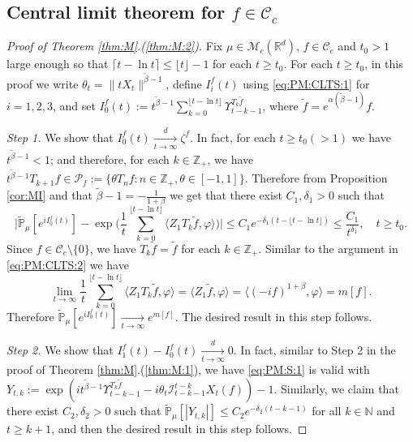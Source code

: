 \documentclass[EJP]{ejpecp} %
\begin{document}
\subsection{Central limit theorem for $f \in \mathcal C_c$}
\begin{proof}[Proof of Theorem \ref{thm:M}.(\ref{thm:M:2})]
	Fix $\mu\in \mathcal M_c(\mathbb R^d)$, $f\in \mathcal C_c$ and $t_0 > 1$ large enough so that $ \lceil t - \ln t\rceil \leq \lfloor t \rfloor - 1$ for each $t\geq t_0$.
	For each $t\geq t_0$, in this proof we write $\theta_t = \|t X_t\|^{\tilde \beta - 1}$,  define $I_i^f(t)$ using \eqref{eq:PM:CLTS:1}  for $i = 1,2,3$, and set $ I^f_0(t) := t^{\tilde \beta - 1}\sum_{k=0}^{\lfloor t-\ln t \rfloor} \Upsilon_{t-k-1}^{T_{k} \tilde f}$, where $\tilde f = e^{\alpha(\tilde \beta - 1)} f$.

	\emph{Step 1.} We show that $I^f_0(t) \xrightarrow[t\to \infty]{d} \zeta^f$.
	In fact, for each $t \geq  t_0( > 1)$ we have $t^{\tilde \beta - 1} < 1$; and therefore, for each $k \in \mathbb Z_+$, we have $t^{\tilde \beta - 1} T_{k+1} f \in \mathcal P_f:=\{\theta T_n f: n \in \mathbb Z_+, \theta \in [-1,1]\}$.
	Therefore from Proposition \ref{cor:MI} and that $\tilde \beta - 1 = -\frac{1}{1+\beta}$ we get that there exist $C_1,\delta_1 > 0$ such that
\[
    \Big|\mathbb{\widetilde{P}}_{\mu} [e^{i I^f_0(t)} ]-\exp\Big(\frac{1}{t}\sum_{k=0}^{\lfloor t-\ln t \rfloor} \langle Z_1T_{k}\tilde f, \varphi\rangle \Big)\Big|
    \leq C_1 e^{-\delta_1(t - \lfloor t - \ln t\rfloor)}
    \leq \frac{C_1}{t^{\delta_1}},
    \quad t\geq t_0.
\]
	Since $f \in \mathcal C_c\setminus \{0\}$, we have $T_k \tilde f = \tilde f$ for each $k \in \mathbb Z_+$.
	Similar to the argument in \eqref{eq:PM:CLTS:2} we have
\begin{equation}
\label{CLT:C:eq:m}
    \lim_{t\to \infty} \frac{1}{t}\sum_{k=0}^{\lfloor t-\ln t \rfloor} \langle Z_1 T_{k}\tilde f, \varphi\rangle
    = \langle Z_1 \tilde f,\varphi \rangle
    = \langle (-if)^{1+\beta}, \varphi \rangle
    = m[f].
\end{equation}
	Therefore $\mathbb {\widetilde P}_\mu[e^{i I^f_0(t)}] \xrightarrow[t\to \infty]{} e^{m[f]}$.
	The desired result in this step follows.

	\emph{Step 2.} We show that $ I^f_1(t) - I^f_0 (t) \xrightarrow[t\to \infty]{d} 0$.
  	In fact, similar to Step 2 in the proof of Theorem \ref{thm:M}.(\ref{thm:M:1}), we  have \eqref{eq:PM:S:1} is valid with $ Y_{t,k} := \exp(i t^{\tilde \beta - 1} \Upsilon_{t-k-1}^{T_{k}\tilde f} - i\theta_t \mathcal I_{t-k-1}^{t-k} X_t(f)) - 1$.
  	Similarly, we claim that there exist $C_2, \delta_2>0$ such that $\widetilde {\mathbb P}_\mu [|Y_{t,k}|] \leq C_2 e^{-\delta_2 (t-k-1)}$ for all $k\in \mathbb N$ and $t\geq k+1$, and  then the desired result in this step follows.


\end{proof}
\end{document}
